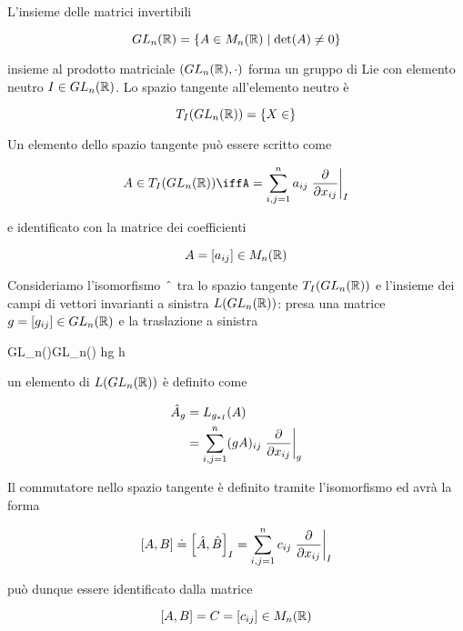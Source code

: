 L'insieme delle matrici invertibili

\begin{equation}
	GL_{n}(\mathbb{R}) = \{ A \in M_{n}(\mathbb{R}) \mid \det(A) \neq 0 \}
\end{equation}

insieme al prodotto matriciale $ (GL_{n}(\mathbb{R}),\cdot) $ forma un gruppo di Lie con elemento neutro $ I \in GL_{n}(\mathbb{R}) $. Lo spazio tangente all'elemento neutro è

\begin{equation}
	T_{I}(GL_{n}(\mathbb{R})) = \{ X \in  \}
\end{equation}

Un elemento dello spazio tangente può essere scritto come

\begin{equation}
	A \in T_{I}(GL_{n}(\R)) %
	\iff%
	A = \sum_{i,j=1}^{n} a_{ij} \eval{ \pdv{x_{ij}} }_{I}
\end{equation}

e identificato con la matrice dei coefficienti

\begin{equation}
	A = [a_{ij}] \in M_{n}(\mathbb{R})
\end{equation}

Consideriamo l'isomorfismo $ \; \hat{} \; $ tra lo spazio tangente $ T_{I}(GL_{n}(\mathbb{R})) $ e l'insieme dei campi di vettori invarianti a sinistra $ L(GL_{n}(\mathbb{R})) $: presa una matrice $ g = [g_{ij}] \in GL_{n}(\mathbb{R}) $ e la traslazione a sinistra

%
	{GL_{n}(\R)}{GL_{n}(\R)}%
	{h}{g h}

un elemento di $ L(GL_{n}(\mathbb{R})) $ è definito come

\begin{align}
	\begin{split}
		\hat{A}_{g} &= L_{g_{*I}} (A)\\
		&= \sum_{i,j=1}^{n} (g A)_{ij} \eval{ \pdv{x_{ij}} }_{g}
	\end{split}
\end{align}

Il commutatore nello spazio tangente è definito tramite l'isomorfismo ed avrà la forma

\begin{equation}
	\comm{A}{B} \doteq \comm{\hat{A}}{\hat{B}}_{I} = \sum_{i,j=1}^{n} c_{ij} \eval{ \pdv{x_{ij}} }_{I}
\end{equation}

può dunque essere identificato dalla matrice

\begin{equation}
	\comm{A}{B} = C = [c_{ij}] \in M_{n}(\R)
\end{equation}

